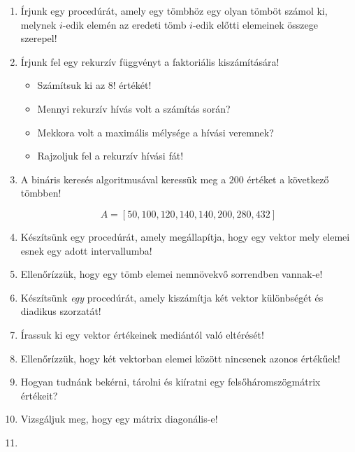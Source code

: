 \documentclass[a4paper]{article}
\begin{document}
\begin{enumerate}
\item

Írjunk egy procedúrát, amely egy tömbhöz egy olyan tömböt számol ki, melynek $i$-edik elemén az eredeti tömb $i$-edik előtti elemeinek összege szerepel!

\item Írjunk fel egy rekurzív függvényt a faktoriális kiszámítására!
\begin{itemize}
	\item Számítsuk ki az $8!$ értékét!
	\item Mennyi rekurzív hívás volt a számítás során?
	\item Mekkora volt a maximális mélysége a hívási veremnek?
	\item Rajzoljuk fel a rekurzív hívási fát!
\end{itemize}

\item A bináris keresés algoritmusával keressük meg a $200$ értéket a következő tömbben!

$$
A = [50, 100, 120, 140, 140, 200, 280, 432]
$$

\item

Készítsünk egy procedúrát, amely megállapítja, hogy egy vektor mely elemei esnek egy adott intervallumba!

\item

Ellenőrízzük, hogy egy tömb elemei nemnövekvő sorrendben vannak-e!

\item

Készítsünk \textit{egy} procedúrát, amely kiszámítja két vektor különbségét és diadikus szorzatát!

\item

Írassuk ki egy vektor értékeinek mediántól való eltérését!

\item

Ellenőrízzük, hogy két vektorban elemei között nincsenek azonos értékűek!

\item

Hogyan tudnánk bekérni, tárolni és kiíratni egy felsőháromszögmátrix értékeit?

\item

Vizsgáljuk meg, hogy egy mátrix diagonális-e!

\item


\end{enumerate}
\end{document}
